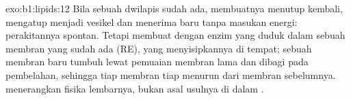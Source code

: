 \begin{solution}{exo:b1:lipids:12}
Bila sebuah dwilapis sudah ada,  membuatnya menutup
kembali, mengatup menjadi vesikel dan menerima  baru tanpa masukan
energi: perakitannya spontan. Tetapi  membuat  dengan enzim
yang duduk dalam sebuah membran yang sudah ada (RE), yang menyisipkannya
di tempat; sebuah membran baru tumbuh lewat pemuaian membran lama dan
dibagi pada pembelahan, sehingga tiap membran tiap  menurun dari
membran  sebelumnya.  menerangkan fisika lembarnya,
bukan asal usulnya di dalam .
\end{solution}

